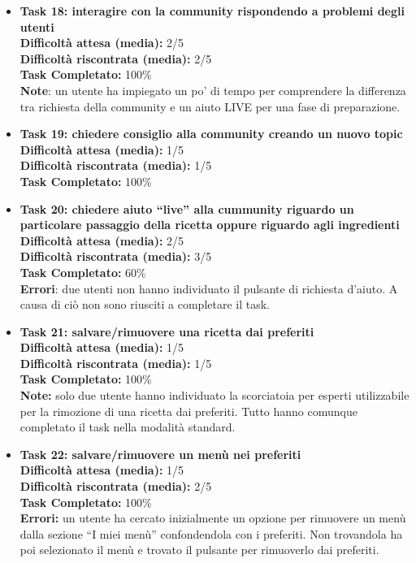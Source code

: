 \begin{itemize}
\item
\textbf{Task 18: interagire con la community rispondendo a problemi
degli utenti}\\
\textbf{Difficoltà attesa (media):} 2/5\\
\textbf{Difficoltà riscontrata (media):} 2/5\\
\textbf{Task Completato:} 100\%\\
\textbf{Note}: un utente ha impiegato un po' di tempo per comprendere la
differenza tra richiesta della community e un aiuto LIVE per una fase di
preparazione.

\item
\textbf{Task 19: chiedere consiglio alla community creando un nuovo
topic}\\
\textbf{Difficoltà attesa (media):} 1/5\\
\textbf{Difficoltà riscontrata (media):} 1/5\\
\textbf{Task Completato:} 100\%\\

\item
\textbf{Task 20: chiedere aiuto ``live'' alla cummunity riguardo un
particolare passaggio della ricetta oppure riguardo agli ingredienti}\\
\textbf{Difficoltà attesa (media):} 2/5\\
\textbf{Difficoltà riscontrata (media):} 3/5\\
\textbf{Task Completato:} 60\%\\
\textbf{Errori}: due utenti non hanno individuato il pulsante di
richiesta d'aiuto. A causa di ciò non sono riusciti a completare il
task.

\item
\textbf{Task 21: salvare/rimuovere una ricetta dai preferiti}\\
\textbf{Difficoltà attesa (media):} 1/5\\
\textbf{Difficoltà riscontrata (media):} 1/5\\
\textbf{Task Completato:} 100\%\\
\textbf{Note:} solo due utente hanno individuato la scorciatoia per
esperti utilizzabile per la rimozione di una ricetta dai preferiti.
Tutto hanno comunque completato il task nella modalità standard.

\item
\textbf{Task 22: salvare/rimuovere un menù nei preferiti}\\
\textbf{Difficoltà attesa (media):} 1/5\\
\textbf{Difficoltà riscontrata (media):} 2/5\\
\textbf{Task Completato:} 100\%\\
\textbf{Errori:} un utente ha cercato inizialmente un opzione per
rimuovere un menù dalla sezione ``I miei menù'' confondendola con i
preferiti. Non trovandola ha
poi selezionato il menù e trovato il pulsante per rimuoverlo dai
preferiti.


\end{itemize}
